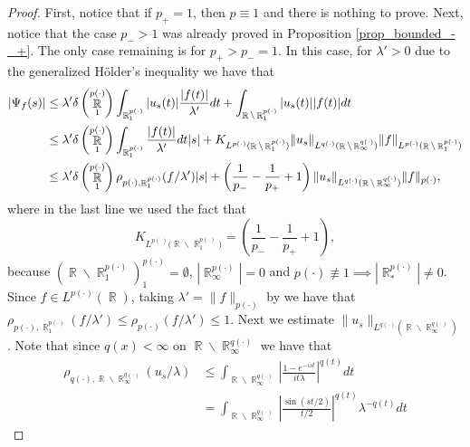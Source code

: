 \documentclass[11pt,reqno]{amsart}
\theoremstyle{definition}
\theoremstyle{definition}
\theoremstyle{definition}
\DeclareMathOperator{\R}{\mathbb{R}}
\newcommand{\p}{p(\cdot)}
\newcommand{\Lp}{L^{\p}(\R)}
\begin{document}
\begin{proof}
First, notice that if $p_{+}=1$, then $p\equiv 1$ and there is nothing to prove.
 Next, notice that the case  $p_{-}>1$ was already proved in Proposition  \ref{prop_bounded_-_+}. The only case remaining is for $p_{+}>p_{-}=1$. In this case, for $\lambda'>0$  due to the generalized Hölder's inequality we have that
 \begin{align}
     |{\Psi_f(s)}|&\leq{\lambda'}\delta\left(\R_1^{\p}\right)\int_{\R^{\p}_1}|u_s(t)|\frac{|f(t)|}{\lambda'}dt+\int_{\R\backslash\R^{\p}_1}|u_s(t)||f(t)|dt\notag\\
     &\leq \lambda'\delta\left(\R_1^{\p}\right)\int_{\R^{\p}_1}\frac{|f(t)|}{\lambda'}dt|s|+K_{L^{\p}({\R\backslash\R^{\p}_1)}}\|u_s\|_{L^{q(\cdot)}(\R\backslash\R_{\infty}^{q(\cdot)})}\|f\|_{L^{\p}({\R\backslash\R^{\p}_1)}}\notag\\
     &\leq \lambda'\delta\left(\R_1^{\p}\right)\rho_{\p,\R^{\p}_1}(f/\lambda')|s|+\left(\frac{1}{p_{-}}-\frac{1}{p_{+}}+1\right)\|u_s\|_{L^{q(\cdot)}(\R\backslash\R_{\infty}^{q(\cdot)})}\|f\|_{\p},\label{ineq_bounded}
 \end{align}
    where in the last line we used the fact that 
    \begin{equation*}
        K_{L^{\p}({\R\backslash\R^{\p}_1)}}=\left(\frac{1}{p_{-}}-\frac{1}{p_{+}}+1\right),
    \end{equation*}
    because $\left(\R\backslash\R^{\p}_1\right)^{\p}_1=\emptyset$, $|\R^{\p}_{\infty}|=0$ and $\p\not\equiv1\implies |\R^{\p}_*|\neq 0$.
    Since $f\in \Lp$, taking  $\lambda'=\|f\|_{\p}$ by \cite[Proposition 2.21]{Cruz-Uribe} we have that $\rho_{\p,\R^{\p}_1}(f/\lambda')\leq \rho_{\p}(f/\lambda')\leq1$. Next we estimate $\|u_s\|_{L^{q(\cdot)}(\R\backslash\R_{\infty}^{q(\cdot)})}$. 
    Note that since $q(x)<\infty$ on $\R\backslash\R_{\infty}^{q(\cdot)}$ we have that
    \begin{align*}
        \rho_{q(\cdot),\R\backslash\R_{\infty}^{q(\cdot)}}(u_s/\lambda)&\leq \int_{\R\backslash\R_{\infty}^{q(\cdot)}}\left|\frac{1-e^{-ist}}{it\lambda}\right|^{q(t)}dt%
        \\
        &=\int_{\R\backslash\R_{\infty}^{q(\cdot)}}\left|\frac{\sin(st/2)}{t/2}\right|^{q(t)}\lambda^{-q(t)}dt%
    \end{align*}

\end{proof}
\end{document}

